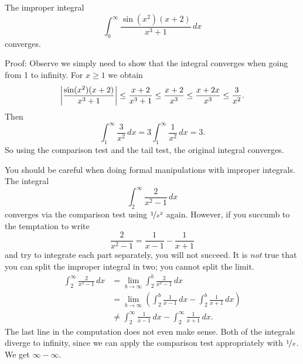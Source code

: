 \begin{example}
The improper integral
\begin{equation*}
\int_0^\infty \frac{\sin(x^2)(x+2)}{x^3+1} \,dx
\end{equation*}
converges.

Proof:  Observe we simply need to show
that the integral converges when going from 1 to infinity.
For $x \geq 1$ we obtain
\begin{equation*}
\left\lvert {\frac{\sin(x^2)(x+2)}{x^3+1}} \right\rvert
\leq
\frac{x+2}{x^3+1}
\leq \frac{x+2}{x^3} \leq
\frac{x+2x}{x^3} \leq \frac{3}{x^2} .
\end{equation*}
Then
\begin{equation*}
\int_1^\infty \frac{3}{x^2}\,dx
=
3 \int_1^\infty \frac{1}{x^2}\,dx
=
3 .
\end{equation*}
So using the comparison test and the tail test, the original
integral converges.
\end{example}

\begin{example}
You should be careful when doing formal manipulations with improper
integrals.
The integral
\begin{equation*}
\int_2^\infty \frac{2}{x^2-1}\,dx
\end{equation*}
converges via the comparison test using $\nicefrac{1}{x^2}$ again.  However, if you
succumb to the temptation to write
\begin{equation*}
\frac{2}{x^2-1} = 
\frac{1}{x-1}
-
\frac{1}{x+1} 
\end{equation*}
and try to integrate each part separately, you will not succeed.
It is \emph{not} true that you can split the improper
integral in two; you cannot split the limit.
\begin{equation*}
\begin{split}
\int_2^\infty \frac{2}{x^2-1} \,dx &=
\lim_{b\to \infty} \int_2^b \frac{2}{x^2-1} \,dx
\\
&=
\lim_{b\to \infty}
\left(
\int_2^b \frac{1}{x-1}\,dx
-
\int_2^b \frac{1}{x+1}\,dx
\right)
\\
&\not=
\int_2^\infty \frac{1}{x-1}\,dx
-
\int_2^\infty \frac{1}{x+1}\,dx .
\end{split}
\end{equation*}
The last line in the computation does not even make sense.  Both of the
integrals diverge to infinity, since we can
apply the comparison test appropriately with
$\nicefrac{1}{x}$.  We get $\infty - \infty$.
\end{example}

